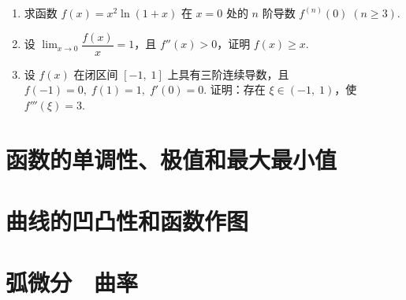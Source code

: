 \begin{enumerate}
    \item 求函数 $f(x)=x^2\ln(1+x)$ 在 $x=0$ 处的 $n$ 阶导数 $f^{(n)}(0)\;(n\geqslant3)$.
    
    \item 设 $\displaystyle\lim_{x\to0}\dfrac{f(x)}{x}=1$，且 $f''(x)>0$，证明 $f(x)\geqslant x$.
    
    \item 设 $f(x)$ 在闭区间 $[-1,\;1]$ 上具有三阶连续导数，且 $f(-1)=0,\;f(1)=1,\;f'(0)=0$. 
    证明：存在 $\xi\in(-1,\;1)$，使 $f'''(\xi)=3$.


\end{enumerate}

\section{函数的单调性、极值和最大最小值}


\section{曲线的凹凸性和函数作图}


\section{弧微分$\quad$曲率}

